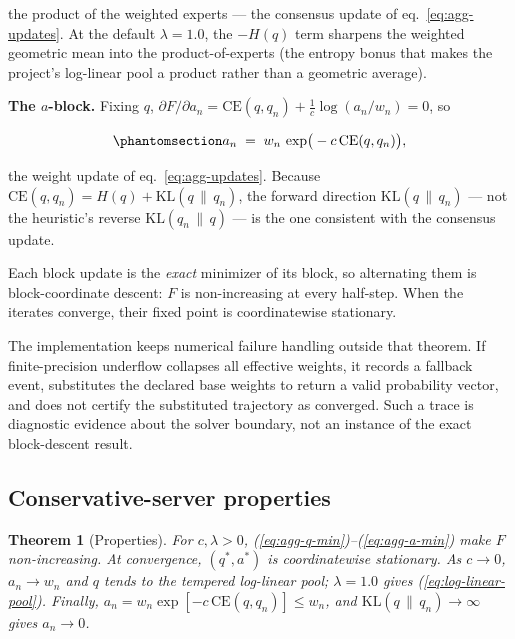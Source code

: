 \documentclass[
  english,
]{article}
\theoremstyle{plain}
\newtheorem{theorem}{Theorem}
\theoremstyle{definition}
\theoremstyle{remark}
\theoremstyle{definition}
\begin{document}
the product of the weighted experts --- the consensus update of
eq.~\ref{eq:agg-updates}. At the default \(\lambda=1.0\), the \(-H(q)\)
term sharpens the weighted geometric mean into the product-of-experts
(the entropy bonus that makes the project's log-linear pool a product
rather than a geometric average).

\textbf{The \(a\)-block.} Fixing \(q\),
\(\partial F/\partial a_n = \mathrm{CE}(q,q_n) + \tfrac{1}{c}\log(a_n/w_n) = 0\),
so

\begin{equation}\protect\phantomsection\label{eq:agg-a-min}{a_n \;=\; w_n\,\exp\!\big(-c\,\mathrm{CE}(q, q_n)\big),}\end{equation}

the weight update of eq.~\ref{eq:agg-updates}. Because
\(\mathrm{CE}(q,q_n) = H(q) + \mathrm{KL}(q\,\|\,q_n)\), the forward
direction \(\mathrm{KL}(q\,\|\,q_n)\) --- not the heuristic's reverse
\(\mathrm{KL}(q_n\,\|\,q)\) --- is the one consistent with the consensus
update.

Each block update is the \emph{exact} minimizer of its block, so
alternating them is block-coordinate descent: \(F\) is non-increasing at
every half-step. When the iterates converge, their fixed point is
coordinatewise stationary.

The implementation keeps numerical failure handling outside that
theorem. If finite-precision underflow collapses all effective weights,
it records a fallback event, substitutes the declared base weights to
return a valid probability vector, and does not certify the substituted
trajectory as converged. Such a trace is diagnostic evidence about the
solver boundary, not an instance of the exact block-descent result.

\subsection{Conservative-server properties}\label{sec:supp-theorem}

\begin{theorem}[Properties]
\label{thm:variational-aggregation}
For \(c,\lambda>0\), (\ref{eq:agg-q-min})–(\ref{eq:agg-a-min}) make \(F\)
non-increasing. At convergence, \((q^*,a^*)\) is coordinatewise stationary.
As \(c\to0\), \(a_n\to w_n\) and \(q\) tends to the tempered log-linear pool;
\(\lambda=1.0\) gives
(\ref{eq:log-linear-pool}). Finally,
\(a_n=w_n\exp[-c\,\mathrm{CE}(q,q_n)]\le w_n\), and
\(\mathrm{KL}(q\,\|\,q_n)\to\infty\) gives \(a_n\to0\).
\end{theorem}
\end{document}
